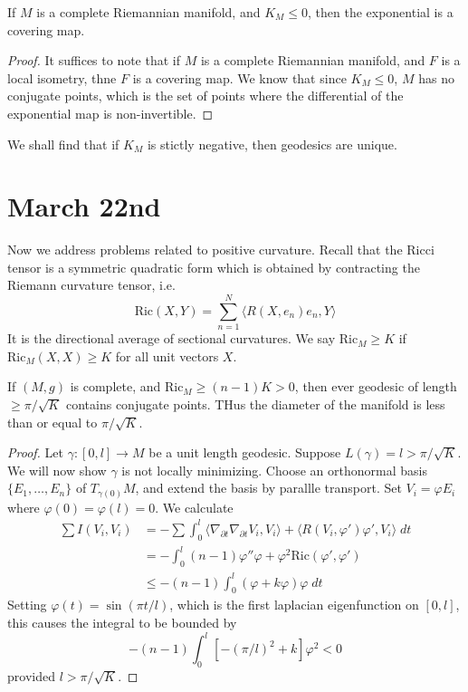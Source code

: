 \begin{theorem}
    If $M$ is a complete Riemannian manifold, and $K_M \leq 0$, then the exponential is a covering map.
\end{theorem}
\begin{proof}
    It suffices to note that if $M$ is a complete Riemannian manifold, and $F$ is a local isometry, thne $F$ is a covering map. We know that since $K_M \leq 0$, $M$ has no conjugate points, which is the set of points where the differential of the exponential map is non-invertible.
\end{proof}

We shall find that if $K_M$ is stictly negative, then geodesics are unique.

\section{March 22nd}

Now we address problems related to positive curvature. Recall that the Ricci tensor is a symmetric quadratic form which is obtained by contracting the Riemann curvature tensor, i.e.
%
\[ \text{Ric}(X,Y)  = \sum_{n = 1}^N \langle R(X,e_n) e_n, Y \rangle \]
%
It is the directional average of sectional curvatures. We say $\text{Ric}_M \geq K$ if $\text{Ric}_M(X,X) \geq K$ for all unit vectors $X$.

\begin{theorem}
    If $(M,g)$ is complete, and $\text{Ric}_M \geq (n-1)K > 0$, then ever geodesic of length $\geq \pi/\sqrt{K}$ contains conjugate points. THus the diameter of the manifold is less than or equal to $\pi/\sqrt{K}$.
\end{theorem}
\begin{proof}
    Let $\gamma: [0,l] \to M$ be a unit length geodesic. Suppose $L(\gamma) = l > \pi/\sqrt{K}$. We will now show $\gamma$ is not locally minimizing. Choose an orthonormal basis $\{ E_1, \dots, E_n \}$ of $T_{\gamma(0)} M$, and extend the basis by parallle transport. Set $V_i = \varphi E_i$ where $\varphi(0) = \varphi(l) = 0$. We calculate
    \begin{align*}
        \sum I(V_i,V_i) &= - \sum \int_0^l \langle \nabla_{\partial t} \nabla_{\partial t} V_i, V_i \rangle + \langle R(V_i, \varphi') \varphi', V_i \rangle\; dt\\
        &= - \int_0^l (n-1) \varphi'' \varphi + \varphi^2 \text{Ric}(\varphi', \varphi')\\
        &\leq -(n-1) \int_0^l (\varphi + k\varphi) \varphi\; dt
    \end{align*}
    Setting $\varphi(t) = \sin(\pi t/l)$, which is the first laplacian eigenfunction on $[0,l]$, this causes the integral to be bounded by
    \[ -(n-1) \int_0^l [-(\pi/l)^2 + k] \varphi^2 < 0 \]
    provided $l > \pi/\sqrt{K}$.
\end{proof}

